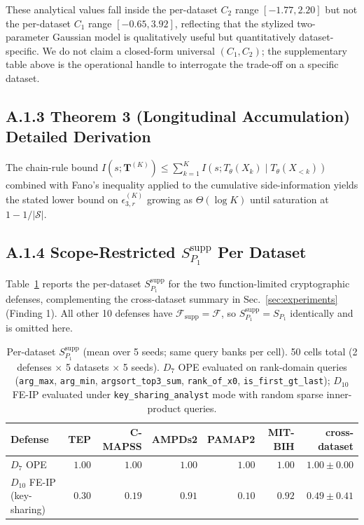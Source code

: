 \documentclass{article}
\theoremstyle{remark}
\begin{document}
These analytical values fall inside the per-dataset $C_2$ range $[-1.77, 2.20]$ but not the per-dataset $C_1$ range $[-0.65, 3.92]$, reflecting that the stylized two-parameter Gaussian model is qualitatively useful but quantitatively dataset-specific. We do not claim a closed-form universal $(C_1, C_2)$; the supplementary table above is the operational handle to interrogate the trade-off on a specific dataset.

\subsection*{A.1.3 Theorem 3 (Longitudinal Accumulation) Detailed Derivation}
The chain-rule bound $I(s; \mathbf{T}^{(K)}) \le \sum_{k=1}^K I(s; T_\theta(X_k) \mid T_\theta(X_{<k}))$ combined with Fano's inequality applied to the cumulative side-information yields the stated lower bound on $\epsilon_{3, r}^{(K)}$ growing as $\Theta(\log K)$ until saturation at $1 - 1/|\mathcal{S}|$.

\subsection*{A.1.4 Scope-Restricted $S_{P_1}^{\text{supp}}$ Per Dataset}

Table~\ref{tab:sp1_supp_full} reports the per-dataset $S_{P_1}^{\text{supp}}$ for the two function-limited cryptographic defenses, complementing the cross-dataset summary in Sec.~\ref{sec:experiments} (Finding 1). All other 10 defenses have $\mathcal{F}_{\text{supp}} = \mathcal{F}$, so $S_{P_1}^{\text{supp}} = S_{P_1}$ identically and is omitted here.

\begin{table}[h]
\centering
\caption{Per-dataset $S_{P_1}^{\text{supp}}$ (mean over 5 seeds; same query banks per cell). 50 cells total (2 defenses $\times$ 5 datasets $\times$ 5 seeds). $D_7$ OPE evaluated on rank-domain queries (\texttt{arg\_max}, \texttt{arg\_min}, \texttt{argsort\_top3\_sum}, \texttt{rank\_of\_x0}, \texttt{is\_first\_gt\_last}); $D_{10}$ FE-IP evaluated under \texttt{key\_sharing\_analyst} mode with random sparse inner-product queries.}
\label{tab:sp1_supp_full}
\small
\begin{tabular}{@{}lrrrrrr@{}}
\toprule
Defense & TEP & C-MAPSS & AMPDs2 & PAMAP2 & MIT-BIH & cross-dataset \\
\midrule
$D_7$ OPE                    & $1.00$ & $1.00$ & $1.00$ & $1.00$ & $1.00$ & $\mathbf{1.00 \pm 0.00}$ \\
$D_{10}$ FE-IP (key-sharing) & $0.30$ & $0.19$ & $0.91$ & $0.10$ & $0.92$ & $\mathbf{0.49 \pm 0.41}$ \\
\bottomrule
\end{tabular}
\end{table}
\end{document}
